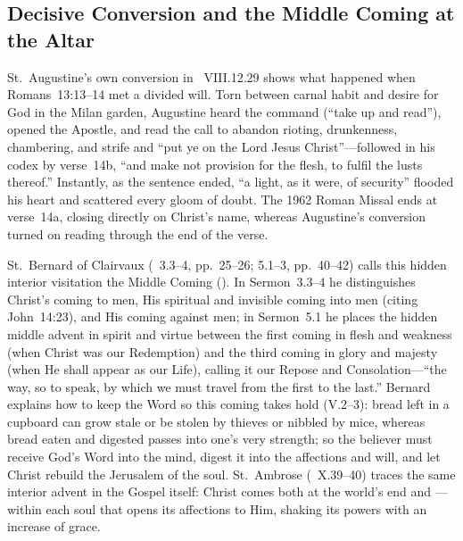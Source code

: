 \subsection{Decisive Conversion and the Middle Coming at the Altar}

St.~Augustine's own conversion in ~VIII.12.29 shows what happened when Romans~13:13--14 met a divided will. Torn between carnal habit and desire for God in the Milan garden, Augustine heard the command  (``take up and read''), opened the Apostle, and read the call to abandon rioting, drunkenness, chambering, and strife and ``put ye on the Lord Jesus Christ''---followed in his codex by verse~14b, ``and make not provision for the flesh, to fulfil the lusts thereof.'' Instantly, as the sentence ended, ``a light, as it were, of security'' flooded his heart and scattered every gloom of doubt. The 1962 Roman Missal ends at verse~14a, closing directly on Christ's name, whereas Augustine's conversion turned on reading through the end of the verse.

St.~Bernard of Clairvaux (~3.3--4, pp.~25--26; 5.1--3, pp.~40--42) calls this hidden interior visitation the Middle Coming (). In Sermon~3.3--4 he distinguishes Christ's coming to men, His spiritual and invisible coming into men (citing John~14:23), and His coming against men; in Sermon~5.1 he places the hidden middle advent in spirit and virtue between the first coming in flesh and weakness (when Christ was our Redemption) and the third coming in glory and majesty (when He shall appear as our Life), calling it our Repose and Consolation---``the way, so to speak, by which we must travel from the first to the last.'' Bernard explains how to keep the Word so this coming takes hold (V.2--3): bread left in a cupboard can grow stale or be stolen by thieves or nibbled by mice, whereas bread eaten and digested passes into one's very strength; so the believer must receive God's Word into the mind, digest it into the affections and will, and let Christ rebuild the Jerusalem of the soul. St.~Ambrose (~X.39--40) traces the same interior advent in the Gospel itself: Christ comes both at the world's end and ---within each soul that opens its affections to Him, shaking its powers with an increase of grace.

